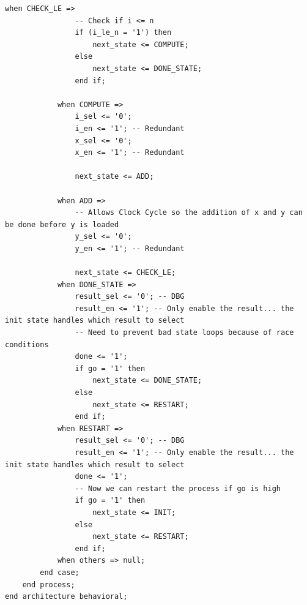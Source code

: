 \documentclass{article}
\begin{document}
\begin{lstlisting}[caption=Two Process FSM VHDL Code, label=lst:two-process-fsm-vhdl-code]
            when CHECK_LE =>
                -- Check if i <= n
                if (i_le_n = '1') then
                    next_state <= COMPUTE;
                else
                    next_state <= DONE_STATE;
                end if;
            
            when COMPUTE =>
                i_sel <= '0';
                i_en <= '1'; -- Redundant
                x_sel <= '0';
                x_en <= '1'; -- Redundant

                next_state <= ADD;

            when ADD =>
                -- Allows Clock Cycle so the addition of x and y can be done before y is loaded
                y_sel <= '0';
                y_en <= '1'; -- Redundant

                next_state <= CHECK_LE;
            when DONE_STATE =>
                result_sel <= '0'; -- DBG 
                result_en <= '1'; -- Only enable the result... the init state handles which result to select
                -- Need to prevent bad state loops because of race conditions
                done <= '1';
                if go = '1' then
                    next_state <= DONE_STATE;
                else
                    next_state <= RESTART;
                end if;
            when RESTART =>
                result_sel <= '0'; -- DBG 
                result_en <= '1'; -- Only enable the result... the init state handles which result to select
                done <= '1';
                -- Now we can restart the process if go is high
                if go = '1' then
                    next_state <= INIT;
                else
                    next_state <= RESTART;
                end if;
            when others => null;
        end case;
    end process;
end architecture behavioral;
\end{lstlisting}
\end{document}
